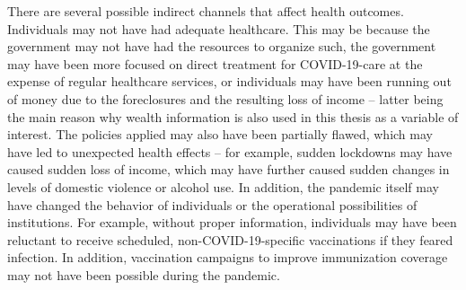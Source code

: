 \documentclass[12pt,a4paper,notitlepage]{article}
\begin{document}
There are several possible indirect channels that affect health outcomes. Individuals may not have had adequate healthcare. This may be because the government may not have had the resources to organize such, the government may have been more focused on direct treatment for COVID-19-care at the expense of regular healthcare services, or individuals may have been running out of money due to the foreclosures and the resulting loss of income -- latter being the main reason why wealth information is also used in this thesis as a variable of interest. The policies applied may also have been partially flawed, which may have led to unexpected health effects -- for example, sudden lockdowns may have caused sudden loss of income, which may have further caused sudden changes in levels of domestic violence or alcohol use. In addition, the pandemic itself may have changed the behavior of individuals or the operational possibilities of institutions. For example, without proper information, individuals may have been reluctant to receive scheduled, non-COVID-19-specific vaccinations if they feared infection. In addition, vaccination campaigns to improve immunization coverage may not have been possible during the pandemic.
\end{document}
